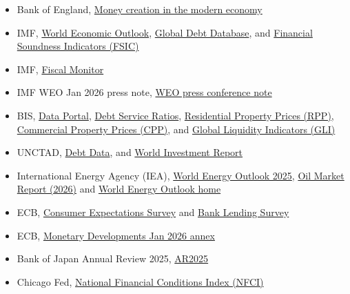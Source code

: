 \documentclass[11pt,openany]{book}
\begin{document}
\begin{itemize}
  \item Bank of England, \href{https://www.bankofengland.co.uk/quarterly-bulletin/2014/q1/money-creation-in-the-modern-economy}{Money creation in the modern economy}
  \item IMF, \href{https://data.imf.org/Datasets/WEO}{World Economic Outlook}, \href{https://data.imf.org/en/datasets/IMF.FAD%3AGDD}{Global Debt Database}, and \href{https://data.imf.org/Datasets/FSIC}{Financial Soundness Indicators (FSIC)}
  \item IMF, \href{https://www.imf.org/en/Publications/FM}{Fiscal Monitor}
  \item IMF WEO Jan 2026 press note, \href{https://www.imf.org/en/news/articles/2026/01/21/tr-01212026-weo-press-conference-on-release-of-the-january-2026-world-economic-outlook-update}{WEO press conference note}
  \item BIS, \href{https://data.bis.org/}{Data Portal}, \href{https://data.bis.org/topics/DSR}{Debt Service Ratios}, \href{https://data.bis.org/topics/RPP/tables-and-dashboards}{Residential Property Prices (RPP)}, \href{https://data.bis.org/topics/CPP}{Commercial Property Prices (CPP)}, and \href{https://data.bis.org/topics/GLI}{Global Liquidity Indicators (GLI)}
  \item UNCTAD, \href{https://unctad.org/publications/debt-data}{Debt Data}, and \href{https://unctad.org/publications/world-investment-report}{World Investment Report}
  \item International Energy Agency (IEA), \href{https://iea.blob.core.windows.net/assets/4cb0fba1-9c9e-4f7e-bb3e-7a74f8f9f9b2/IEA%20World%20Energy%20Outlook%202025.pdf}{World Energy Outlook 2025}, \href{https://www.iea.org/reports/oil-market-report-2025}{Oil Market Report (2026)} and \href{https://www.iea.org/reports/world-energy-outlook}{World Energy Outlook home}
  \item ECB, \href{https://www.ecb.europa.eu/stats/ecb_surveys/consumer_exp_survey/html/index.en.html}{Consumer Expectations Survey} and \href{https://www.ecb.europa.eu/stats/ecb_surveys/bank_lending_survey/html/index.en.html}{Bank Lending Survey}
  \item ECB, \href{https://www.ecb.europa.eu/press/pdf/md/ecb.md2601_annex~df0e665d8e.en.pdf}{Monetary Developments Jan 2026 annex}
  \item Bank of Japan Annual Review 2025, \href{https://www.boj.or.jp/en/about/activities/act/data/ar2025.pdf}{AR2025}
  \item Chicago Fed, \href{https://www.chicagofed.org/research/data/nfci/current-data}{National Financial Conditions Index (NFCI)}

\end{itemize}
\end{document}
